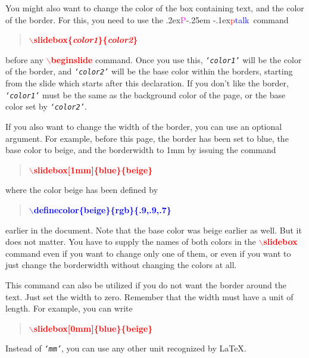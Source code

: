 \documentclass[12pt]{article}
\def\pptalk{{
\raise.2ex\hbox{\textcolor{magenta}P}\kern-.25em
\raise-.1ex\hbox{\textcolor{red}p}\textcolor{blue}{talk}}}
\def\ecomm#1{{\textcolor{blue}{$\backslash${\bf #1}}}}
\def\comm#1{{\textcolor{red}{$\backslash${\bf #1}}}}
\def\txtem#1{\texttt{\sl `#1'}}
\begin{document}
You might also want to change the color of the box containing text,
and the color of the border.  For this, you need to use the \pptalk\
command 
%
\begin{quote}
\comm{slidebox\{{\em color1}\}\{{\em color2}\}}
\end{quote}
%
before any \comm{beginslide} command.  
Once you use this, \txtem{color1} will be the color of the
border, and \txtem{color2} will 
be the base color within the borders, starting from the slide which
starts after this declaration.  If you don't like the border, 
\txtem{color1} must be the same as the background color of the
page, or the base color set by \txtem{color2}.


\endslide


\beginslide

If you also want to change the width of the border, you can use an
optional argument.  For example, before this page, the border has been
set to blue, the base color to beige, and the borderwidth to 1mm by
issuing the command
%
\begin{quote}
\comm{slidebox[1mm]\{blue\}\{beige\}}
\end{quote}
%
where the color beige has been defined by
%
\begin{quote}
\ecomm{definecolor\{beige\}\{rgb\}\{.9,.9,.7\}}
\end{quote}
%
earlier in the document.  Note that the base color was
beige earlier as well.  But it does not matter.  You have to supply
the names of both colors in the \comm{slidebox} command even if you
want to change only one of them, or even if you want to just change
the borderwidth without changing the colors at all.

\newsegment

This command can also be utilized if you do not want the border around
the text.  Just set the width to zero.   Remember that the width must
have a unit of length.   For example, you can write
%
\begin{quote}
\comm{slidebox[0mm]\{blue\}\{beige\}}
\end{quote}
%
Instead of \txtem{mm}, you can use any other unit recognized by \LaTeX.



\endslide



\beginslide
\end{document}
